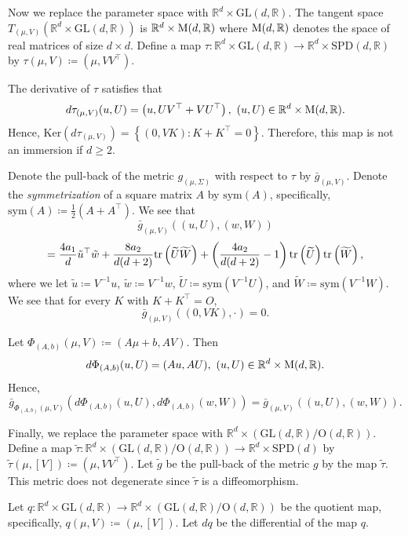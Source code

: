 \documentclass[a4paper, reqno, 11pt]{article}
\theoremstyle{definition}
\def\GL{\mathrm{GL}}
\def\O{\mathrm{O}}
\def\sym{\mathrm{sym}}
\def\SPD{\mathrm{SPD}}
\def\Ker{{\mathrm{Ker}}}
\begin{document}
Now we replace the parameter space with $\mathbb{R}^d \times \GL(d,\mathbb{R})$. 
The tangent space $T_{(\mu,V)}(\mathbb{R}^d \times \GL(d,\mathbb{R}))$ is $\mathbb{R}^d \times \textup{M}(d,\mathbb{R})$ where $\textup{M}(d,\mathbb{R})$ denotes the space of real matrices of size $d\times d$. 
Define a map $\tau \colon \mathbb{R}^d \times \GL(d,\mathbb{R}) \to \mathbb{R}^d \times \SPD(d,\mathbb{R})$ by $\tau(\mu, V) \coloneqq  (\mu, V V^{\top})$. 

The derivative of $\tau$ satisfies that 
\[ d\tau_{(\mu,V)}(u,U) = \left(u, U V^{\top} + V U^{\top}\right), \ (u,U) \in \mathbb{R}^d \times \textup{M}(d,\mathbb{R}). \]
Hence, $\Ker(d\tau_{(\mu,V)}) = \left\{(0,VK) \colon K + K^{\top} = 0 \right\}$. 
Therefore, this map is not an immersion if $d \ge 2$. 


Denote the pull-back of the metric $g_{(\mu,\Sigma)}$ with respect to $\tau$ by $\bar{g}_{(\mu,V)}$. 
Denote the {\it symmetrization} of a square matrix $A$ by $\sym(A)$, specifically, 
$\sym(A) \coloneqq  \frac{1}{2} (A + A^{\top})$.
We see that 
\[ \bar{g}_{(\mu,V)}\left((u,U), (w,W) \right) \]
\[ = \frac{4a_1}{d} \tilde{u}^{\top} \tilde{w} + \frac{8 a_2}{d(d+2)} \textup{tr}\left(\widetilde{U} \widetilde{W}\right) + \left(\frac{4a_2}{d(d+2)}  - 1 \right) \textup{tr}\left(\widetilde{U}\right) \textup{tr}\left(\widetilde{W}\right), \]
where we let $\tilde{u} \coloneqq  V^{-1} u$, $\tilde{w} \coloneqq  V^{-1} w$, $\widetilde{U} \coloneqq  \sym(V^{-1}U)$, and $\widetilde{W} \coloneqq  \sym(V^{-1}W)$. 
We see that for every $K$ with $K + K^{\top} = O$, 
\[ \bar{g}_{(\mu,V)}\left((0,VK),\cdot \right) = 0. \]


Let $\Phi_{(A,b)}(\mu, V) \coloneqq  (A\mu + b, AV)$. 
Then 
\[ d\Phi_{(A,b)}(u,U) = (Au, AU), \  (u,U) \in \mathbb{R}^d \times \textup{M}(d,\mathbb{R}). \]
Hence,  
\[ \bar{g}_{\Phi_{(A,b)}(\mu,V)}\left( d\Phi_{(A,b)}(u,U), d\Phi_{(A,b)}(w,W)\right) = \bar{g}_{(\mu,V)}\left((u,U), (w,W) \right). \]


Finally, we replace the parameter space with $\mathbb{R}^d \times (\GL(d,\mathbb{R})/\O(d,\mathbb{R}))$. 
Define a map $\tilde\tau \colon \mathbb{R}^d \times (\GL(d,\mathbb{R})/\O(d,\mathbb{R})) \to \mathbb{R}^d \times \SPD(d)$ by $\tilde\tau(\mu, [V]) \coloneqq  (\mu, V V^{\top})$. 
Let $\tilde{g}$ be the pull-back of the metric $g$ by the map $\tilde{\tau}$. 
This metric does not degenerate since $\tilde\tau$ is a diffeomorphism. 


Let $q \colon \mathbb{R}^d \times \GL(d, \mathbb R) \to \mathbb{R}^d \times (\GL(d,\mathbb{R})/\O(d,\mathbb{R}))$ be the quotient map, specifically, $q(\mu,V) \coloneqq  (\mu, [V])$. 
Let $dq$ be the differential of the map $q$. 
\end{document}
